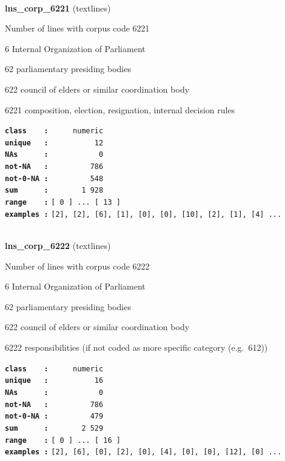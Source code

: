 \documentclass[]{article}
\begin{document}
~

\textbf{lns\_corp\_6221} (textlines)

Number of lines with corpus code 6221

6 Internal Organization of Parliament

62 parliamentary presiding bodies

622 council of elders or similar coordination body

6221 composition, election, resignation, internal decision rules

\textbf{\texttt{class\ \ \ \ :}} \texttt{~~~~~numeric}\\
\textbf{\texttt{unique\ \ \ :}} \texttt{~~~~~~~~~~12}\\
\textbf{\texttt{NAs\ \ \ \ \ \ :}} \texttt{~~~~~~~~~~~0}\\
\textbf{\texttt{not-NA\ \ \ :}} \texttt{~~~~~~~~~786}\\
\textbf{\texttt{not-0-NA\ :}} \texttt{~~~~~~~~~548}\\
\textbf{\texttt{sum\ \ \ \ \ \ :}} \texttt{~~~~~~~1~928}\\
\textbf{\texttt{range\ \ \ \ :}}
\texttt{{[}\ 0\ {]}\ ...\ {[}\ 13\ {]}}\\
\textbf{\texttt{examples\ :}}
\texttt{{[}2{]},\ {[}2{]},\ {[}6{]},\ {[}1{]},\ {[}0{]},\ {[}0{]},\ {[}10{]},\ {[}2{]},\ {[}1{]},\ {[}4{]}\ ...}\\

~

\textbf{lns\_corp\_6222} (textlines)

Number of lines with corpus code 6222

6 Internal Organization of Parliament

62 parliamentary presiding bodies

622 council of elders or similar coordination body

6222 responsibilities (if not coded as more specific category
(e.g.~612))

\textbf{\texttt{class\ \ \ \ :}} \texttt{~~~~~numeric}\\
\textbf{\texttt{unique\ \ \ :}} \texttt{~~~~~~~~~~16}\\
\textbf{\texttt{NAs\ \ \ \ \ \ :}} \texttt{~~~~~~~~~~~0}\\
\textbf{\texttt{not-NA\ \ \ :}} \texttt{~~~~~~~~~786}\\
\textbf{\texttt{not-0-NA\ :}} \texttt{~~~~~~~~~479}\\
\textbf{\texttt{sum\ \ \ \ \ \ :}} \texttt{~~~~~~~2~529}\\
\textbf{\texttt{range\ \ \ \ :}}
\texttt{{[}\ 0\ {]}\ ...\ {[}\ 16\ {]}}\\
\textbf{\texttt{examples\ :}}
\texttt{{[}2{]},\ {[}6{]},\ {[}0{]},\ {[}2{]},\ {[}0{]},\ {[}4{]},\ {[}0{]},\ {[}0{]},\ {[}12{]},\ {[}0{]}\ ...}\\
\end{document}
